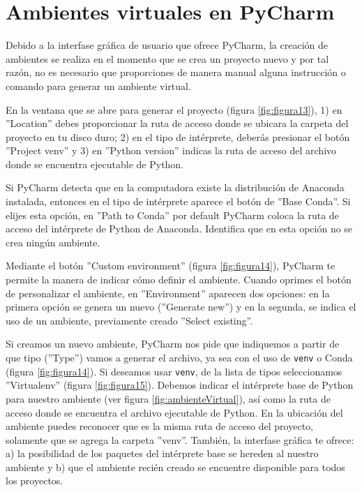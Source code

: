 \documentclass{article}
\begin{document}
	\section{Ambientes virtuales en PyCharm}
	Debido a la interfase gráfica de usuario que ofrece PyCharm, la creación de ambientes se realiza en el momento que se crea un proyecto nuevo y por tal razón, no es necesario que proporciones de manera manual alguna instrucción o comando para generar un ambiente virtual.\bigskip
	
	En la ventana que se abre para generar el proyecto (figura \ref{fig:figura13}), 1) en ''Location'' debes proporcionar la ruta de acceso donde se ubicara la carpeta del proyecto en tu disco duro; 2) en el tipo de intérprete, deberás presionar el botón ''Project venv'' y 3) en ''Python version'' indicas la ruta de acceso del archivo donde se encuentra ejecutable de Python.\bigskip
	
	Si PyCharm detecta que en la computadora existe la distribución de Anaconda instalada, entonces en el tipo de intérprete aparece el botón de ''Base Conda''. Si elijes esta opción, en ''Path to Conda'' por default PyCharm coloca la ruta de acceso del intérprete de Python de Anaconda. Identifica que en esta opción no se crea ningún ambiente.\bigskip 
	
	Mediante el botón ''Custom environment'' (figura \ref{fig:figura14}), PyCharm te permite la manera de indicar cómo definir el ambiente. Cuando oprimes el botón de personalizar el ambiente, en ''Environment'' aparecen dos opciones: en la primera opción se genera un nuevo (''Generate new'') y en la segunda, se indica el uso de un ambiente, previamente creado ''Select existing''. \bigskip
	
	Si creamos un nuevo ambiente, PyCharm nos pide que indiquemos a partir de que tipo (''Type'') vamos a generar el archivo, ya sea con el uso de \texttt{venv} o Conda (figura \ref{fig:figura14}). Si deseamos usar \texttt{venv}, de la lista de tipos seleccionamos ''Virtualenv'' (figura \ref{fig:figura15}). Debemos indicar el intérprete base de Python para nuestro ambiente (ver figura \ref{fig:ambienteVirtual}), así como la ruta de acceso donde se encuentra el archivo ejecutable de Python. En la ubicación del ambiente puedes reconocer que es la misma ruta de acceso del proyecto, solamente que se agrega la carpeta ''venv''. También, la interfase gráfica te ofrece: a) la posibilidad de los paquetes del intérprete base se hereden al nuestro ambiente y b) que el ambiente recién creado se encuentre disponible para todos los proyectos.
	
\end{document}
